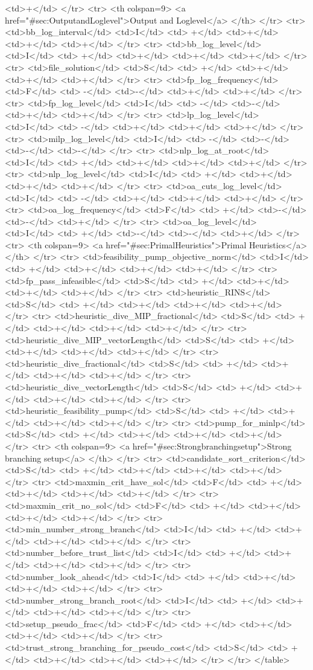 {{<td>+</td>
</tr>
<tr>   <th colspan=9> <a href="#sec:OutputandLoglevel">Output and Loglevel</a> </th>
</tr>
<tr>
<td>bb_log_interval</td>
<td>I</td>
<td> +</td>
<td>+</td>
<td>+</td>
<td>+</td>
</tr>
<tr>
<td>bb_log_level</td>
<td>I</td>
<td> +</td>
<td>+</td>
<td>+</td>
<td>+</td>
</tr>
<tr>
<td>file_solution</td>
<td>S</td>
<td> +</td>
<td>+</td>
<td>+</td>
<td>+</td>
</tr>
<tr>
<td>fp_log_frequency</td>
<td>F</td>
<td> -</td>
<td>-</td>
<td>+</td>
<td>+</td>
</tr>
<tr>
<td>fp_log_level</td>
<td>I</td>
<td> -</td>
<td>-</td>
<td>+</td>
<td>+</td>
</tr>
<tr>
<td>lp_log_level</td>
<td>I</td>
<td> -</td>
<td>+</td>
<td>+</td>
<td>+</td>
</tr>
<tr>
<td>milp_log_level</td>
<td>I</td>
<td> -</td>
<td>-</td>
<td>-</td>
<td>-</td>
</tr>
<tr>
<td>nlp_log_at_root</td>
<td>I</td>
<td> +</td>
<td>+</td>
<td>+</td>
<td>+</td>
</tr>
<tr>
<td>nlp_log_level</td>
<td>I</td>
<td> +</td>
<td>+</td>
<td>+</td>
<td>+</td>
</tr>
<tr>
<td>oa_cuts_log_level</td>
<td>I</td>
<td> -</td>
<td>+</td>
<td>+</td>
<td>+</td>
</tr>
<tr>
<td>oa_log_frequency</td>
<td>F</td>
<td> +</td>
<td>-</td>
<td>-</td>
<td>+</td>
</tr>
<tr>
<td>oa_log_level</td>
<td>I</td>
<td> +</td>
<td>-</td>
<td>-</td>
<td>+</td>
</tr>
<tr>   <th colspan=9> <a href="#sec:PrimalHeuristics">Primal Heuristics</a> </th>
</tr>
<tr>
<td>feasibility_pump_objective_norm</td>
<td>I</td>
<td> +</td>
<td>+</td>
<td>+</td>
<td>+</td>
</tr>
<tr>
<td>fp_pass_infeasible</td>
<td>S</td>
<td> +</td>
<td>+</td>
<td>+</td>
<td>+</td>
</tr>
<tr>
<td>heuristic_RINS</td>
<td>S</td>
<td> +</td>
<td>+</td>
<td>+</td>
<td>+</td>
</tr>
<tr>
<td>heuristic_dive_MIP_fractional</td>
<td>S</td>
<td> +</td>
<td>+</td>
<td>+</td>
<td>+</td>
</tr>
<tr>
<td>heuristic_dive_MIP_vectorLength</td>
<td>S</td>
<td> +</td>
<td>+</td>
<td>+</td>
<td>+</td>
</tr>
<tr>
<td>heuristic_dive_fractional</td>
<td>S</td>
<td> +</td>
<td>+</td>
<td>+</td>
<td>+</td>
</tr>
<tr>
<td>heuristic_dive_vectorLength</td>
<td>S</td>
<td> +</td>
<td>+</td>
<td>+</td>
<td>+</td>
</tr>
<tr>
<td>heuristic_feasibility_pump</td>
<td>S</td>
<td> +</td>
<td>+</td>
<td>+</td>
<td>+</td>
</tr>
<tr>
<td>pump_for_minlp</td>
<td>S</td>
<td> +</td>
<td>+</td>
<td>+</td>
<td>+</td>
</tr>
<tr>   <th colspan=9> <a href="#sec:Strongbranchingsetup">Strong branching setup</a> </th>
</tr>
<tr>
<td>candidate_sort_criterion</td>
<td>S</td>
<td> +</td>
<td>+</td>
<td>+</td>
<td>+</td>
</tr>
<tr>
<td>maxmin_crit_have_sol</td>
<td>F</td>
<td> +</td>
<td>+</td>
<td>+</td>
<td>+</td>
</tr>
<tr>
<td>maxmin_crit_no_sol</td>
<td>F</td>
<td> +</td>
<td>+</td>
<td>+</td>
<td>+</td>
</tr>
<tr>
<td>min_number_strong_branch</td>
<td>I</td>
<td> +</td>
<td>+</td>
<td>+</td>
<td>+</td>
</tr>
<tr>
<td>number_before_trust_list</td>
<td>I</td>
<td> +</td>
<td>+</td>
<td>+</td>
<td>+</td>
</tr>
<tr>
<td>number_look_ahead</td>
<td>I</td>
<td> +</td>
<td>+</td>
<td>+</td>
<td>+</td>
</tr>
<tr>
<td>number_strong_branch_root</td>
<td>I</td>
<td> +</td>
<td>+</td>
<td>+</td>
<td>+</td>
</tr>
<tr>
<td>setup_pseudo_frac</td>
<td>F</td>
<td> +</td>
<td>+</td>
<td>+</td>
<td>+</td>
</tr>
<tr>
<td>trust_strong_branching_for_pseudo_cost</td>
<td>S</td>
<td> +</td>
<td>+</td>
<td>+</td>
<td>+</td>
</tr>
</tr>
</table>
}
}
